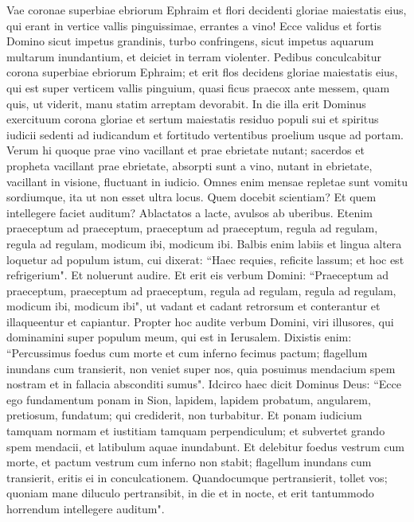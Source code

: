\begin{biblechapter}  
\verse Vae coronae superbiae ebriorum Ephraim et flori decidenti gloriae maiestatis eius, qui erant in vertice vallis pinguissimae, errantes a vino! 
\verse Ecce validus et fortis Domino sicut impetus grandinis, turbo confringens, sicut impetus aquarum multarum inundantium, et deiciet in terram violenter. 
\verse Pedibus conculcabitur corona superbiae ebriorum Ephraim; 
\verse et erit flos decidens gloriae maiestatis eius, qui est super verticem vallis pinguium, quasi ficus praecox ante messem, quam quis, ut viderit, manu statim arreptam devorabit. 
\verse In die illa erit Dominus exercituum corona gloriae et sertum maiestatis residuo populi sui 
\verse et spiritus iudicii sedenti ad iudicandum et fortitudo vertentibus proelium usque ad portam. 
\verse Verum hi quoque prae vino vacillant et prae ebrietate nutant; sacerdos et propheta vacillant prae ebrietate, absorpti sunt a vino, nutant in ebrietate, vacillant in visione, fluctuant in iudicio. 
\verse Omnes enim mensae repletae sunt vomitu sordiumque, ita ut non esset ultra locus. 
\verse Quem docebit scientiam? Et quem intellegere faciet auditum? Ablactatos a lacte, avulsos ab uberibus. 
\verse Etenim praeceptum ad praeceptum, praeceptum ad praeceptum, regula ad regulam, regula ad regulam, modicum ibi, modicum ibi. 
\verse Balbis enim labiis et lingua altera loquetur ad populum istum, 
\verse cui dixerat: “Haec requies, reficite lassum; et hoc est refrigerium". Et noluerunt audire. 
\verse Et erit eis verbum Domini: “Praeceptum ad praeceptum, praeceptum ad praeceptum, regula ad regulam, regula ad regulam, modicum ibi, modicum ibi", ut vadant et cadant retrorsum et conterantur et illaqueentur et capiantur. 
\verse Propter hoc audite verbum Domini, viri illusores, qui dominamini super populum meum, qui est in Ierusalem. 
\verse Dixistis enim: “Percussimus foedus cum morte et cum inferno fecimus pactum; flagellum inundans cum transierit, non veniet super nos, quia posuimus mendacium spem nostram et in fallacia absconditi sumus". 
\verse Idcirco haec dicit Dominus Deus: “Ecce ego fundamentum ponam in Sion, lapidem, lapidem probatum, angularem, pretiosum, fundatum; qui crediderit, non turbabitur. 
\verse Et ponam iudicium tamquam normam et iustitiam tamquam perpendiculum; et subvertet grando spem mendacii, et latibulum aquae inundabunt. 
\verse Et delebitur foedus vestrum cum morte, et pactum vestrum cum inferno non stabit; flagellum inundans cum transierit, eritis ei in conculcationem. 
\verse Quandocumque pertransierit, tollet vos; quoniam mane diluculo pertransibit, in die et in nocte, et erit tantummodo horrendum intellegere auditum". 

\end{biblechapter}
